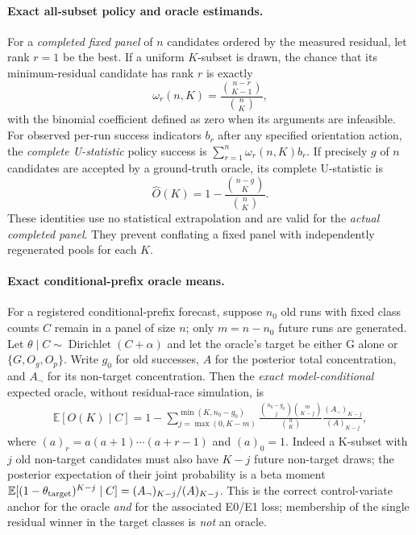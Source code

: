 \paragraph{Exact all-subset policy and oracle estimands.}
For a \emph{completed fixed panel} of $n$ candidates ordered by the
measured residual, let rank $r=1$ be the best. If a uniform $K$-subset
is drawn, the chance that its minimum-residual candidate has rank
$r$ is exactly
\begin{equation}\label{eq:suppl-subset-weight}
 \omega_r(n,K)=\frac{\binom{n-r}{K-1}}{\binom nK},
\end{equation}
with the binomial coefficient defined as zero when its arguments are
infeasible. For observed per-run success indicators $b_r$ after
any specified orientation action, the \emph{complete U-statistic}
policy success is $\sum_{r=1}^n\omega_r(n,K)b_r$.
If precisely $g$ of $n$ candidates are accepted by a ground-truth
oracle, its complete U-statistic is
\begin{equation}\label{eq:suppl-oracle-subset}
 \widehat O(K)=1-\frac{\binom{n-g}{K}}{\binom nK}.
\end{equation}
These identities use no statistical extrapolation and are valid for
the \emph{actual completed panel}. They prevent conflating a fixed
panel with independently regenerated pools for each $K$.

\paragraph{Exact conditional-prefix oracle means.}
For a registered conditional-prefix forecast, suppose $n_0$ old
runs with fixed class counts $C$ remain in a panel of size $n$;
only $m=n-n_0$ future runs are generated. Let
$\theta\mid C\sim\operatorname{Dirichlet}(C+\alpha)$ and let the
oracle's target be either G alone or $\{G,O_g,O_p\}$.
Write $g_0$ for old successes, $A$ for the posterior total
concentration, and $A_{\neg}$ for its non-target concentration.
Then the \emph{exact model-conditional} expected oracle, without
residual-race simulation, is
\begin{align}\label{eq:suppl-S3-prefix-oracle}
 \mathbb E[O(K)\mid C]
 =1-\sum_{j=\max(0,K-m)}^{\min(K,n_0-g_0)}
 \frac{\binom{n_0-g_0}{j}\binom{m}{K-j}}{\binom nK}
 \frac{(A_{\neg})_{K-j}}{(A)_{K-j}},
\end{align}
where $(a)_r=a(a+1)\cdots(a+r-1)$ and $(a)_0=1$.
Indeed a K-subset with $j$ old non-target candidates must also have
$K-j$ future non-target draws; the posterior expectation of their
joint probability is a beta moment
$\mathbb E[(1-\theta_{\rm target})^{K-j}\mid C]
 =(A_{\neg})_{K-j}/(A)_{K-j}$.
This is the correct control-variate anchor for the oracle \emph{and}
for the associated E0/E1 loss; membership of the single residual
winner in the target classes is \emph{not} an oracle.

